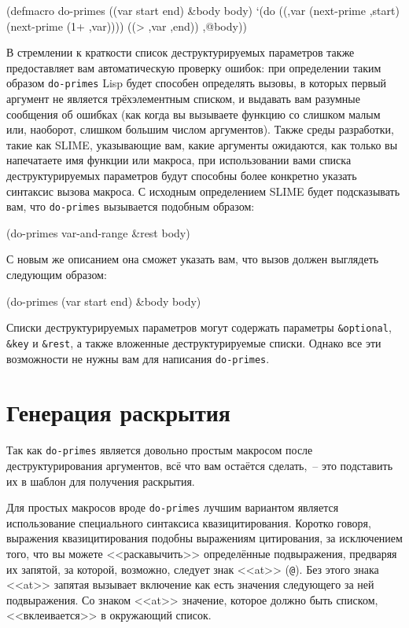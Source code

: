 \begin{myverb}
(defmacro do-primes ((var start end) &body body)
  `(do ((,var (next-prime ,start) (next-prime (1+ ,var))))
       ((> ,var ,end))
     ,@body))
\end{myverb}

В стремлении к краткости список деструктурируемых параметров также предоставляет вам
автоматическую проверку ошибок: при определении таким образом \lstinline{do-primes} Lisp будет
способен определять вызовы, в которых первый аргумент не является трёхэлементным списком,
и выдавать вам разумные сообщения об ошибках (как когда вы вызываете функцию со слишком
малым или, наоборот, слишком большим числом аргументов). Также среды разработки, такие
как SLIME, указывающие вам, какие аргументы ожидаются, как только вы напечатаете имя
функции или макроса, при использовании вами списка деструктурируемых параметров будут
способны более конкретно указать синтаксис вызова макроса. С исходным определением SLIME
будет подсказывать вам, что \lstinline{do-primes} вызывается подобным образом:

\begin{myverb}
(do-primes var-and-range &rest body)
\end{myverb}

С новым же описанием она сможет указать вам, что вызов должен выглядеть следующим образом:

\begin{myverb}
(do-primes (var start end) &body body)
\end{myverb}

Списки деструктурируемых параметров могут содержать параметры \lstinline!&optional!,
\lstinline!&key! и \lstinline!&rest!, а также вложенные деструктурируемые списки. Однако
все эти возможности не нужны вам для написания \lstinline{do-primes}.

\section{Генерация раскрытия}

Так как \lstinline{do-primes} является довольно простым макросом после деструктурирования
аргументов, всё что вам остаётся сделать,~-- это подставить их в шаблон для получения
раскрытия.

Для простых макросов вроде \lstinline{do-primes} лучшим вариантом является использование
специального синтаксиса квазицитирования. Коротко говоря, выражения квазицитирования
подобны выражениям цитирования, за исключением того, что вы можете <<раскавычить>>
определённые подвыражения, предваряя их запятой, за которой, возможно, следует знак <<at>>
(\lstinline!@!). Без этого знака <<at>> запятая вызывает включение как есть значения
следующего за ней подвыражения. Со знаком <<at>> значение, которое должно быть списком,
<<вклеивается>> в окружающий список.


